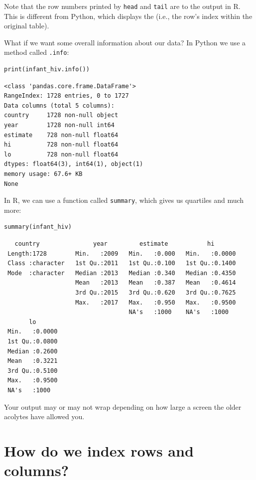 \noindent
Note that the row numbers printed by \texttt{head} and \texttt{tail}
are  to the output in R.
This is different from Python,
which displays the 
(i.e., the row's index within the original table).

What if we want some overall information about our data?
In Python we use a method called \texttt{.info}:

\begin{lstlisting}
print(infant_hiv.info())
\end{lstlisting}

\begin{lstlisting}
<class 'pandas.core.frame.DataFrame'>
RangeIndex: 1728 entries, 0 to 1727
Data columns (total 5 columns):
country     1728 non-null object
year        1728 non-null int64
estimate    728 non-null float64
hi          728 non-null float64
lo          728 non-null float64
dtypes: float64(3), int64(1), object(1)
memory usage: 67.6+ KB
None
\end{lstlisting}

\noindent
In R,
we can use a function called \texttt{summary},
which gives us quartiles and much more:

\begin{lstlisting}
summary(infant_hiv)
\end{lstlisting}

\begin{lstlisting}
   country               year         estimate           hi        
 Length:1728        Min.   :2009   Min.   :0.000   Min.   :0.0000  
 Class :character   1st Qu.:2011   1st Qu.:0.100   1st Qu.:0.1400  
 Mode  :character   Median :2013   Median :0.340   Median :0.4350  
                    Mean   :2013   Mean   :0.387   Mean   :0.4614  
                    3rd Qu.:2015   3rd Qu.:0.620   3rd Qu.:0.7625  
                    Max.   :2017   Max.   :0.950   Max.   :0.9500  
                                   NA's   :1000    NA's   :1000    
       lo        
 Min.   :0.0000  
 1st Qu.:0.0800  
 Median :0.2600  
 Mean   :0.3221  
 3rd Qu.:0.5100  
 Max.   :0.9500  
 NA's   :1000    
\end{lstlisting}

\noindent
Your output may or may not wrap
depending on how large a screen the older acolytes have allowed you.

\section{How do we index rows and columns?}

